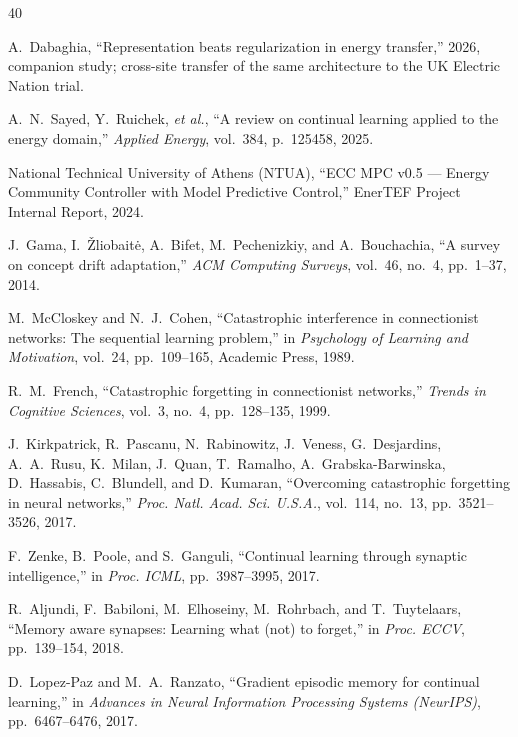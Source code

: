 \documentclass[journal]{IEEEtran}
\begin{document}
\begin{thebibliography}{40}

A.~Dabaghia, ``Representation beats regularization in energy transfer,''
2026, companion study; cross-site transfer of the same architecture to the
UK Electric Nation trial.


A.~N.~Sayed, Y.~Ruichek, \emph{et al.}, ``A review on continual
learning applied to the energy domain,'' \emph{Applied Energy},
vol.~384, p.~125458, 2025.

National Technical University of Athens (NTUA), ``ECC MPC v0.5 ---
Energy Community Controller with Model Predictive Control,'' EnerTEF
Project Internal Report, 2024.

J.~Gama, I.~\v{Z}liobait\.e, A.~Bifet, M.~Pechenizkiy, and
A.~Bouchachia, ``A survey on concept drift adaptation,''
\emph{ACM Computing Surveys}, vol.~46, no.~4, pp.~1--37, 2014.

M.~McCloskey and N.~J.~Cohen, ``Catastrophic interference in
connectionist networks: The sequential learning problem,'' in
\emph{Psychology of Learning and Motivation}, vol.~24, pp.~109--165,
Academic Press, 1989.

R.~M.~French, ``Catastrophic forgetting in connectionist networks,''
\emph{Trends in Cognitive Sciences}, vol.~3, no.~4, pp.~128--135, 1999.

J.~Kirkpatrick, R.~Pascanu, N.~Rabinowitz, J.~Veness, G.~Desjardins,
A.~A.~Rusu, K.~Milan, J.~Quan, T.~Ramalho, A.~Grabska-Barwinska,
D.~Hassabis, C.~Blundell, and D.~Kumaran, ``Overcoming catastrophic
forgetting in neural networks,'' \emph{Proc. Natl. Acad. Sci. U.S.A.},
vol.~114, no.~13, pp.~3521--3526, 2017.

F.~Zenke, B.~Poole, and S.~Ganguli, ``Continual learning through
synaptic intelligence,'' in \emph{Proc. ICML}, pp.~3987--3995, 2017.

R.~Aljundi, F.~Babiloni, M.~Elhoseiny, M.~Rohrbach, and T.~Tuytelaars,
``Memory aware synapses: Learning what (not) to forget,'' in
\emph{Proc. ECCV}, pp.~139--154, 2018.

D.~Lopez-Paz and M.~A.~Ranzato, ``Gradient episodic memory for
continual learning,'' in \emph{Advances in Neural Information
Processing Systems (NeurIPS)}, pp.~6467--6476, 2017.


\end{thebibliography}
\end{document}
